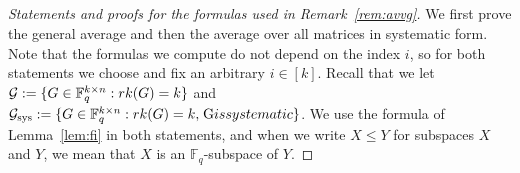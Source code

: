 \documentclass[11pt,a4paper,reqno,twoside]{amsart}
\theoremstyle{definition}
\newcommand{\F}{\mathbb{F}}
\newcommand{\mG}{\mathcal{G}}
\newcommand\rk{\textnormal{rk}}
\begin{document}
\begin{appendix}
\section{}\label{sec:apen}
\begin{proof}[Statements and proofs for the formulas used in Remark~\ref{rem:avvg}] We first prove the general average and then the average over all matrices in systematic form. Note that the formulas we compute do not depend on the index $i$, so for both statements we choose and fix an arbitrary $i \in [k]$. Recall that we let $\mG:=\{G \in \F_q^{k \times n}: \rk(G)=k\}$ and $\mG_{\operatorname{sys}} :=\{G \in \F_q^{k \times n}: \rk(G)=k, \; \textnormal{$G$ is systematic}\}$. We use the formula of Lemma~\ref{lem:fi} in both statements, and when we write $X \le Y$ for subspaces $X$ and $Y$, we mean that $X$ is an $\F_q$-subspace of $Y$.


\end{proof}
\end{appendix}
\end{document}
